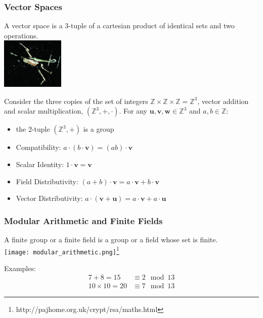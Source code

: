 \documentclass{beamer}
\begin{document}
\begin{frame}
\frametitle{Vector Spaces}
\begin{multicols}{2}
  A vector space is a 3-tuple of a cartesian product of identical sets and two operations. \\
  \columnbreak
  \includegraphics[width=3cm]{X-Wing_TIE.png}
\end{multicols}

Consider the three copies of the set of integers $\mathbb Z\times \mathbb Z\times \mathbb Z = \mathbb Z^3$, vector addition and scalar multiplication, $(\mathbb Z^3,+,\cdot)$.  For any $\pmb u,\pmb v,\pmb w \in \mathbb Z^3$ and $a,b \in \mathbb Z$:
\begin{itemize}
  \item the 2-tuple $(\mathbb Z^3,+)$ is a group
  \item Compatibility: $a\cdot(b\cdot\pmb v) = (ab)\cdot\pmb v$
  \item Scalar Identity: $1\cdot\pmb v = \pmb v$
  \item Field Distributivity: $(a + b)\cdot\pmb v = a\cdot\pmb v + b\cdot\pmb v$
  \item Vector Distributivity: $a\cdot(\pmb v + \pmb u) = a\cdot\pmb v + a\cdot \pmb u$
\end{itemize}
\end{frame}

\begin{frame}
\frametitle{Modular Arithmetic and Finite Fields}
\begin{multicols}{2}
  A finite group or a finite field is a group or a field whose set is finite. \\
  \columnbreak
  \texttt{[image: modular\_arithmetic.png]}\footnote{http://pajhome.org.uk/crypt/rsa/maths.html}
\end{multicols}
Examples:
\begin{align*}
  7 + 8 = 15 &\equiv 2 \mod 13 \\
  10\times10 = 20 &\equiv 7 \mod 13
\end{align*}
\end{frame}
\end{document}
